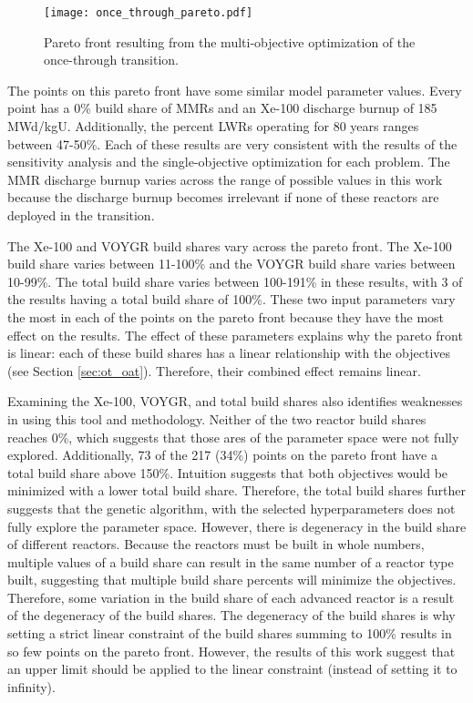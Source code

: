 \begin{figure}[h!][h!][h!]
    \centering 
    \texttt{[image: once\_through\_pareto.pdf]}
    \caption{Pareto front resulting from the multi-objective optimization 
    of the once-through transition.}
    \label{fig:once_through_pareto}
\end{figure}

The points on this pareto front have some similar model parameter values. 
Every point has a 0\% build share of \glspl{MMR} and an Xe-100 discharge 
burnup of 185 MWd/kgU. Additionally, the percent \glspl{LWR} operating 
for 80 years ranges between 47-50\%. Each of these results are very 
consistent with the results of the sensitivity analysis and the 
single-objective optimization for each problem. The \gls{MMR} discharge 
burnup varies 
across the range of possible values in this work because the discharge 
burnup becomes irrelevant if none of these reactors are deployed in the
transition.

The Xe-100 and VOYGR build shares vary across the pareto front. The Xe-100 
build share varies between 11-100\% and the VOYGR build share varies 
between 10-99\%. The total build share varies between 100-191\% in these 
results, with 3 of the results having a total build share of 100\%. 
These two input parameters vary the most in each of the points on 
the pareto front because they have the most effect on the results. The effect of 
these parameters explains why the pareto front is linear: each of these 
build shares has a linear relationship with the objectives (see Section 
\ref{sec:ot_oat}). Therefore, their combined effect remains linear.

Examining the Xe-100, VOYGR, and total build shares also identifies 
weaknesses in using this tool and methodology. Neither of the two reactor 
build shares reaches 0\%, which suggests that those ares of the parameter 
space were not fully explored. Additionally, 73 of the 217 (34\%) points 
on the pareto front have a total build share above 150\%. Intuition 
suggests that both objectives would be minimized with a lower total 
build share. Therefore, the total build shares further suggests that the 
genetic algorithm, with the selected hyperparameters does not fully 
explore the parameter space. 
However, there is degeneracy in the build share of different reactors. 
Because the reactors must be built in whole numbers, multiple values of 
a build share can result in the same number of a reactor type built, 
suggesting that multiple build share percents will minimize the 
objectives. Therefore, some variation in the build share of each 
advanced reactor is a result of the degeneracy of the build 
shares. The degeneracy of the build shares is why setting a strict 
linear constraint of the build shares summing to 100\% results in 
so few points on the pareto front. However, the results of this work 
suggest that an upper limit should be applied to the linear constraint 
(instead of setting it to infinity). 